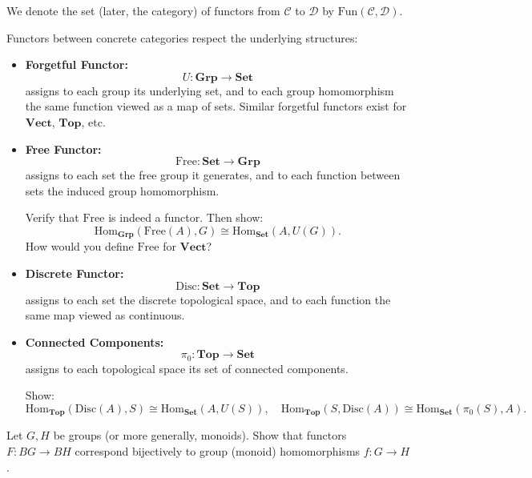 We denote the set (later, the category) of functors from $\mathcal{C}$ to $\mathcal{D}$ by $\mathrm{Fun}(\mathcal{C}, \mathcal{D})$.

\begin{example}
Functors between concrete categories respect the underlying structures:
\begin{itemize}
    \item \textbf{Forgetful Functor:}
    \[
    U: \mathbf{Grp} \to \mathbf{Set}
    \]
    assigns to each group its underlying set, and to each group homomorphism the same function viewed as a map of sets. Similar forgetful functors exist for $\mathbf{Vect}$, $\mathbf{Top}$, etc.

    \item \textbf{Free Functor:}
    \[
    \mathrm{Free}: \mathbf{Set} \to \mathbf{Grp}
    \]
    assigns to each set the free group it generates, and to each function between sets the induced group homomorphism.

    \begin{exercise}
    Verify that $\mathrm{Free}$ is indeed a functor. Then show:
    \[
    \mathrm{Hom}_{\mathbf{Grp}}(\mathrm{Free}(A), G) \cong \mathrm{Hom}_{\mathbf{Set}}(A, U(G)).
    \]
    How would you define $\mathrm{Free}$ for $\mathbf{Vect}$?
    \end{exercise}

    \item \textbf{Discrete Functor:}
    \[
    \mathrm{Disc}: \mathbf{Set} \to \mathbf{Top}
    \]
    assigns to each set the discrete topological space, and to each function the same map viewed as continuous.

    \item \textbf{Connected Components:}
    \[
    \pi_0: \mathbf{Top} \to \mathbf{Set}
    \]
    assigns to each topological space its set of connected components.

    \begin{exercise}
    Show:
    \[
    \mathrm{Hom}_{\mathbf{Top}}(\mathrm{Disc}(A), S) \cong \mathrm{Hom}_{\mathbf{Set}}(A, U(S)), \quad
    \mathrm{Hom}_{\mathbf{Top}}(S, \mathrm{Disc}(A)) \cong \mathrm{Hom}_{\mathbf{Set}}(\pi_0(S), A).
    \]
    \end{exercise}
\end{itemize}
\end{example}

\begin{exercise}
Let $G, H$ be groups (or more generally, monoids). Show that functors $F: BG \to BH$ correspond bijectively to group (monoid) homomorphisms $f: G \to H$.
\end{exercise}

